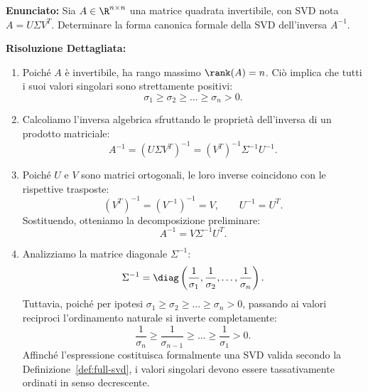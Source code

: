 \begin{example}
\textbf{Enunciato:} Sia $A \in \R^{n \times n}$ una matrice quadrata invertibile, con SVD nota $A = U \Sigma V^T$. Determinare la forma canonica formale della SVD dell'inversa $A^{-1}$.

\medskip
\textbf{Risoluzione Dettagliata:}
\begin{enumerate}
    \item Poich\'e $A$ \`e invertibile, ha rango massimo $\rank(A) = n$. Ci\`o implica che tutti i suoi valori singolari sono strettamente positivi:
    \begin{equation}
        \sigma_1 \ge \sigma_2 \ge \dots \ge \sigma_n > 0.
    \end{equation}
    \item Calcoliamo l'inversa algebrica sfruttando le propriet\`a dell'inversa di un prodotto matriciale:
    \begin{equation}
        A^{-1} = (U \Sigma V^T)^{-1} = (V^T)^{-1} \Sigma^{-1} U^{-1}.
    \end{equation}
    \item Poich\'e $U$ e $V$ sono matrici ortogonali, le loro inverse coincidono con le rispettive trasposte:
    \begin{equation}
        (V^T)^{-1} = (V^{-1})^{-1} = V, \qquad U^{-1} = U^T.
    \end{equation}
    Sostituendo, otteniamo la decomposizione preliminare:
    \begin{equation}
        A^{-1} = V \Sigma^{-1} U^T.
    \end{equation}
    \item Analizziamo la matrice diagonale $\Sigma^{-1}$:
    \begin{equation}
        \Sigma^{-1} = \diag\left(\frac{1}{\sigma_1}, \frac{1}{\sigma_2}, \dots, \frac{1}{\sigma_n}\right).
    \end{equation}
    Tuttavia, poich\'e per ipotesi $\sigma_1 \ge \sigma_2 \ge \dots \ge \sigma_n > 0$, passando ai valori reciproci l'ordinamento naturale si inverte completamente:
    \begin{equation}
        \frac{1}{\sigma_n} \ge \frac{1}{\sigma_{n-1}} \ge \dots \ge \frac{1}{\sigma_1} > 0.
    \end{equation}
    Affinch\'e l'espressione costituisca formalmente una SVD valida secondo la Definizione~\ref{def:full-svd}, i valori singolari devono essere tassativamente ordinati in senso decrescente.


\end{enumerate}
\end{example}
